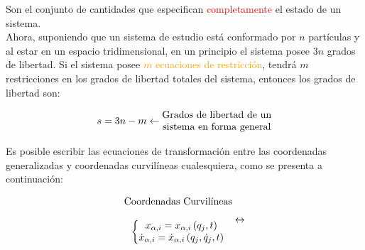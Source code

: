 \documentclass[/home/hernan-barquero/Documents/Apuntes_mecanica_teorica/main.tex]{subfiles}
\begin{document}
    \begin{definition}
        Son el conjunto de cantidades  que especifican \textcolor{red}{completamente} el estado de un sistema. \\

        Ahora, suponiendo que un sistema de estudio está conformado por $n$ partículas y al estar en un espacio tridimensional, en un principio el sistema posee $3n$ grados de libertad. Si el sistema posee \textcolor{orange}{$m$ ecuaciones  de restricción}, tendrá $m$ restricciones en los grados de libertad totales del sistema, entonces los grados de libertad son:

        \begin{equation*}
            s = 3n -m \leftarrow     \begin{matrix} \textup{Grados de libertad de un} \\ \textup{sistema en forma general}\end{matrix}       
        \end{equation*}

        Es posible escribir las ecuaciones de transformación entre las coordenadas generalizadas y coordenadas curvilíneas cualesquiera, como se presenta a continuación:

        \begin{equation*}
            \begin{matrix}
                \begin{matrix}
                \textup{Coordenadas Curvilíneas}  \\ 
                    \\ 
                    \left\{\begin{matrix}
                            x_{\alpha,i} = x_{\alpha,i}\left ( q_{j},t \right ) \\ 
                            \dot{x}_{\alpha,i} = \dot{x}_{\alpha,i} \left (  q_{j}, \dot{q}_{j},t \right ) \\ 
                            \end{matrix}\right .
                \end{matrix} 
                
                \leftrightarrow 
                

\end{matrix}
\end{equation*}
\end{definition}
\end{document}
